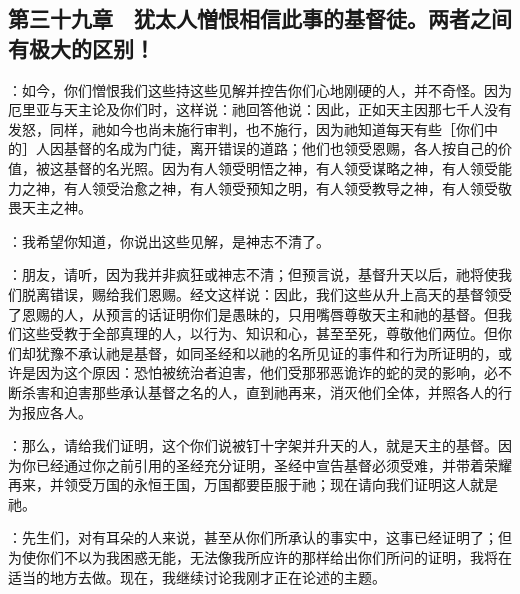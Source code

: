 
\subsection{第三十九章　犹太人憎恨相信此事的基督徒。两者之间有极大的区别！}

：如今，你们憎恨我们这些持这些见解并控告你们心地刚硬的人，并不奇怪。因为厄里亚与天主论及你们时，这样说：祂回答他说：因此，正如天主因那七千人没有发怒，同样，祂如今也尚未施行审判，也不施行，因为祂知道每天有些［你们中的］人因基督的名成为门徒，离开错误的道路；他们也领受恩赐，各人按自己的价值，被这基督的名光照。因为有人领受明悟之神，有人领受谋略之神，有人领受能力之神，有人领受治愈之神，有人领受预知之明，有人领受教导之神，有人领受敬畏天主之神。\par

：我希望你知道，你说出这些见解，是神志不清了。\par

：朋友，请听，因为我并非疯狂或神志不清；但预言说，基督升天以后，祂将使我们脱离错误，赐给我们恩赐。经文这样说：因此，我们这些从升上高天的基督领受了恩赐的人，从预言的话证明你们是愚昧的，只用嘴唇尊敬天主和祂的基督。但我们这些受教于全部真理的人，以行为、知识和心，甚至至死，尊敬他们两位。但你们却犹豫不承认祂是基督，如同圣经和以祂的名所见证的事件和行为所证明的，或许是因为这个原因：恐怕被统治者迫害，他们受那邪恶诡诈的蛇的灵的影响，必不断杀害和迫害那些承认基督之名的人，直到祂再来，消灭他们全体，并照各人的行为报应各人。\par

：那么，请给我们证明，这个你们说被钉十字架并升天的人，就是天主的基督。因为你已经通过你之前引用的圣经充分证明，圣经中宣告基督必须受难，并带着荣耀再来，并领受万国的永恒王国，万国都要臣服于祂；现在请向我们证明这人就是祂。\par

：先生们，对有耳朵的人来说，甚至从你们所承认的事实中，这事已经证明了；但为使你们不以为我困惑无能，无法像我所应许的那样给出你们所问的证明，我将在适当的地方去做。现在，我继续讨论我刚才正在论述的主题。\par


